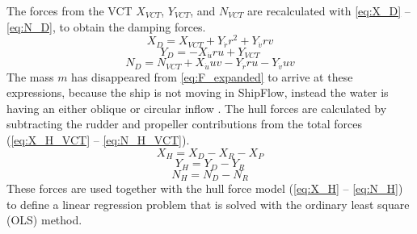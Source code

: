 The forces from the VCT $X_{VCT}$, $Y_{VCT}$, and $N_{VCT}$ are recalculated with \autoref{eq:X_D} -- \autoref{eq:N_D}, to obtain the damping forces.
\begin{equation}
    \label{eq:X_D}
    X_{D} = X_{VCT} + Y_{\dot{r}} r^{2} + Y_{\dot{v}} r v
\end{equation}
\begin{equation}
    \label{eq:Y_D}
    Y_{D} = - X_{\dot{u}} r u + Y_{VCT}
\end{equation}
\begin{equation}
    \label{eq:N_D}
    N_{D} = N_{VCT} + X_{\dot{u}} u v - Y_{\dot{r}} r u - Y_{\dot{v}} u v
\end{equation}
The mass $m$ has disappeared from \autoref{eq:F_expanded} to arrive at these expressions, because the ship is not moving in ShipFlow, instead the water is having an either oblique or circular inflow \citep{roychoudhuryCFDSimulationsSteady2017}.
The hull forces are calculated by subtracting the rudder and propeller contributions from the total forces (\autoref{eq:X_H_VCT} -- \autoref{eq:N_H_VCT}).
\begin{equation}
    \label{eq:X_H_VCT}
    X_H = X_D - X_R - X_P
\end{equation}
\begin{equation}
    \label{eq:Y_H_VCT}
    Y_H = Y_D - Y_R
\end{equation}
\begin{equation}
    \label{eq:N_H_VCT}
    N_H = N_D - N_R
\end{equation}
These forces are used together with the hull force model (\autoref{eq:X_H} -- \autoref{eq:N_H}) to define a linear regression problem that is solved with the ordinary least square (OLS) method. 